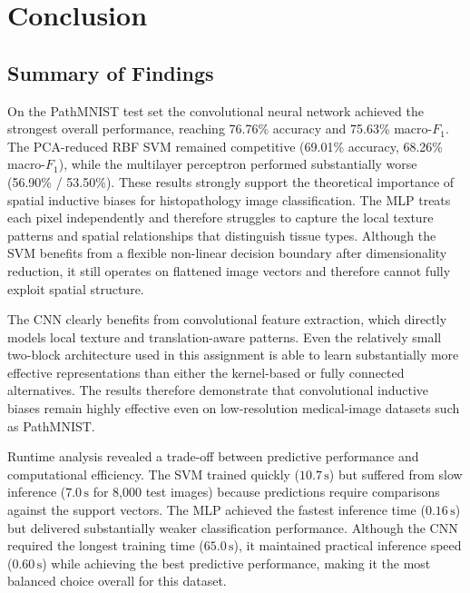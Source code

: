 \documentclass[../main.tex]{subfiles}
\begin{document}
\section{Conclusion}

\subsection{Summary of Findings}
\noindent
On the PathMNIST test set the convolutional neural network achieved the
strongest overall performance, reaching
76.76\% accuracy and
75.63\% macro-$F_{1}$. The
\gls{PCA}-reduced \gls{RBF} \gls{SVM} remained competitive
(69.01\% accuracy,
68.26\% macro-$F_{1}$), while the multilayer perceptron performed
substantially worse
(56.90\% / 53.50\%). These results strongly support the theoretical
importance of spatial inductive biases for histopathology image
classification. The \gls{MLP} treats each pixel independently and
therefore struggles to capture the local texture patterns and spatial
relationships that distinguish tissue types. Although the \gls{SVM}
benefits from a flexible non-linear decision boundary after dimensionality
reduction, it still operates on flattened image vectors and therefore
cannot fully exploit spatial structure.

\noindent
The \gls{CNN} clearly benefits from convolutional feature extraction,
which directly models local texture and translation-aware patterns. Even
the relatively small two-block architecture used in this assignment is
able to learn substantially more effective representations than either
the kernel-based or fully connected alternatives. The results therefore
demonstrate that convolutional inductive biases remain highly effective
even on low-resolution medical-image datasets such as PathMNIST.

\noindent
Runtime analysis revealed a trade-off between predictive performance and
computational efficiency. The \gls{SVM} trained quickly
($10.7\,\text{s}$) but suffered from slow inference
($7.0\,\text{s}$ for
8{,}000 test images) because predictions require comparisons against the
support vectors. The \gls{MLP} achieved the fastest inference time
($0.16\,\text{s}$) but delivered substantially weaker classification
performance. Although the \gls{CNN} required the longest training time
($65.0\,\text{s}$), it maintained practical inference speed
($0.60\,\text{s}$) while achieving the best predictive performance,
making it the most balanced choice overall for this dataset.
\end{document}
